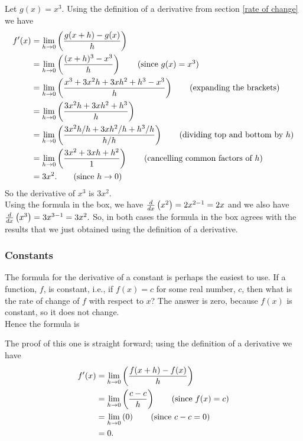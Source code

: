 \noindent Let $g(x) = x^3$. Using the definition of a derivative from section \ref{rate of change} we have
\begin{align*}
f'(x)  & = \lim_{h \rightarrow 0}\left(\frac{g(x+h) - g(x)}{h}\right) \\
	& = \lim_{h \rightarrow 0}\left(\frac{(x+h)^3 - x^3}{h}\right) \tag{since $g(x) = x^3$} \\
	& = \lim_{h \rightarrow 0}\left(\frac{x^3 + 3x^2h + 3xh^2 + h^3 - x^3}{h}\right) \tag{expanding the brackets} \\
	& = \lim_{h \rightarrow 0}\left(\frac{3x^2h + 3xh^2 + h^3}{h}\right) \\
	& = \lim_{h \rightarrow 0}\left(\frac{3x^2h/h + 3xh^2/h + h^3/h}{h/h}\right) \tag{dividing top and bottom by $h$} \\
	& = \lim_{h \rightarrow 0}\left(\frac{3x^2 + 3xh + h^2}{1}\right) \tag{cancelling common factors of $h$} \\
	& = 3x^2. \tag{since $h \rightarrow 0$}
\end{align*}
So the derivative of $x^3$ is $3x^2$. \\

\noindent Using the formula in the box, we have $\frac{d}{dx}\left(x^2\right) = 2x^{2-1} = 2x$ and we also have $\frac{d}{dx}\left(x^3\right) = 3x^{3-1} = 3x^2.$ So, in both cases the formula in the box agrees with the results that we just obtained using the definition of a derivative.

\subsubsection{Constants}
The formula for the derivative of a constant is perhaps the easiest to use. If a function, $f$, is constant, i.e., if $f(x) = c$ for some real number, $c$, then what is the rate of change of $f$ with respect to $x$? The answer is zero, because $f(x)$ is constant, so it does not change. \\

\noindent Hence the formula is

  	\bigskip
	
	\hfil{}
	\bigskip
	\bigskip
	
\noindent The proof of this one is straight forward; using the definition of a derivative we have
\begin{align*}
f'(x)  & = \lim_{h \rightarrow 0}\left(\frac{f(x+h) - f(x)}{h}\right) \\
	& = \lim_{h \rightarrow 0}\left(\frac{c - c}{h}\right) \tag{since $f(x) = c$} \\
	& = \lim_{h \rightarrow 0}\left(0\right) \tag{since $c-c = 0$} \\
	& = 0.
\end{align*}

